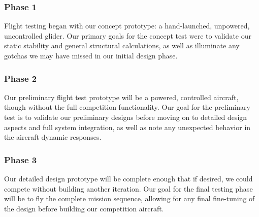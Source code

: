 \documentclass[proposal]{byu-aero}
\begin{document}
\subsubsection{Phase 1} Flight testing began with our concept prototype: a hand-launched, unpowered, uncontrolled glider.  Our primary goals for the concept test were to validate our static stability and general structural calculations, as well as illuminate any gotchas we may have missed in our initial design phase.

\subsubsection{Phase 2} Our preliminary flight test prototype will be a powered, controlled aircraft, though without the full competition functionality.  Our goal for the preliminary test is to validate our preliminary designs before moving on to detailed design aspects and full system integration, as well as note any unexpected behavior in the aircraft dynamic responses. 

\subsubsection{Phase 3} Our detailed design prototype will be complete enough that if desired, we could compete without building another iteration. Our goal for the final testing phase will be to fly the complete mission sequence, allowing for any final fine-tuning of the design before building our competition aircraft.









{}

\end{document}
